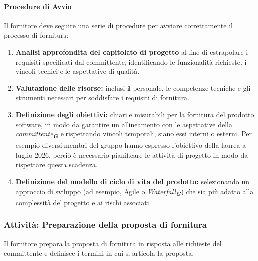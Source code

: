 \documentclass[a4paper,12pt]{article}
\newcommand{\glossario}[1]{\textit{#1}\textsubscript{\textbf{\textit{\textcolor{lightblack}{G}}}}}
\begin{document}
\paragraph{Procedure di Avvio}
Il fornitore deve seguire una serie di procedure per avviare correttamente il processo di fornitura:
\begin{enumerate}
    \item \textbf{Analisi approfondita del capitolato di progetto} al fine di estrapolare i requisiti specificati dal committente, identificando le funzionalità richieste, i vincoli tecnici e le aspettative di qualità.
    \item \textbf{Valutazione delle risorse:} inclusi il personale, le competenze tecniche e gli strumenti necessari per soddisfare i requisiti di fornitura.
    \item \textbf{Definizione degli obiettivi:}  chiari e misurabili per la fornitura del prodotto software, in modo da garantire un allineamento con le aspettative della \glossario{committente} e rispettando vincoli temporali, siano essi interni o esterni. Per esempio diversi membri del gruppo hanno espresso l'obiettivo della laurea a luglio 2026, perciò è necessario pianificare le attività di progetto in modo da rispettare questa scadenza.
    \item \textbf{Definizione del modello di ciclo di vita del prodotto:}  selezionando un approccio di sviluppo (ad esempio, Agile o \glossario{Waterfall}) che sia più adatto alla complessità del progetto e ai rischi associati.
\end{enumerate}

\subsubsection{Attività: Preparazione della proposta di fornitura}
Il fornitore prepara la proposta di fornitura in risposta alle richieste del
committente e definisce i termini in cui si articola la proposta.
\end{document}
